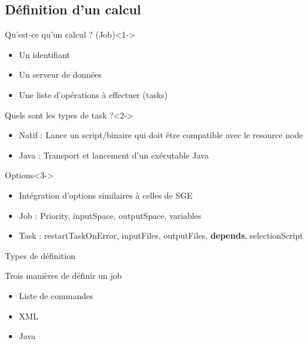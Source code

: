 \documentclass{beamer}
\begin{document}
\subsection{Définition d'un calcul}
\begin{frame}
	\tableofcontents[currentsubsection]
\end{frame}
\begin{frame}
    \vspace{-0.15cm}
        \begin{block}{Qu'est-ce qu'un calcul ? (Job)}<1->
            \begin{itemize}
                \item Un identifiant
                \item Un serveur de données
                \item Une liste d'opérations à effectuer (tasks)%
            \end{itemize}
        \end{block}
        \begin{block}{Quels sont les types de task ?}<2->
            \begin{itemize}
                \item Natif : Lance un script/binaire qui doit être compatible avec le resource node
                \item Java : Transport et lancement d'un exécutable Java
            \end{itemize}
        \end{block}
        \begin{block}{Options}<3->
            \begin{itemize}
                \item Intégration d'options similaires à celles de SGE
                \item Job : Priority, inputSpace, outputSpace, variables
                \item Task : restartTaskOnError, inputFiles, outputFiles, \textbf{depends}, selectionScript
            \end{itemize}
        \end{block}
\end{frame}
\begin{frame}{Types de définition}
    \begin{block}{Trois manières de définir un job}
        \begin{itemize}
            \item Liste de commandes
            \item XML
            \item Java
        \end{itemize}
    \end{block}
    
\end{frame}
\end{document}
